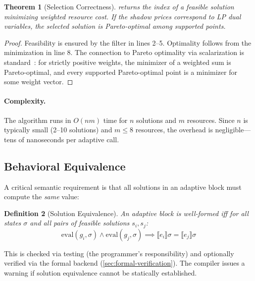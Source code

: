 \documentclass[11pt,a4paper]{article}
\newtheorem{theorem}{Theorem}[section]
\newtheorem{definition}[theorem]{Definition}
\begin{document}
\begin{theorem}[Selection Correctness]
 returns the index of a feasible solution minimizing
weighted resource cost.  If the shadow prices correspond to LP dual variables,
the selected solution is Pareto-optimal among supported points.
\end{theorem}

\begin{proof}
Feasibility is ensured by the filter in lines 2--5.  Optimality follows from
the minimization in line 8.  The connection to Pareto optimality via
scalarization is standard~\cite{ehrgott2005}: for strictly positive weights,
the minimizer of a weighted sum is Pareto-optimal, and every supported
Pareto-optimal point is a minimizer for some weight vector.
\end{proof}

\paragraph{Complexity.}  The algorithm runs in $O(nm)$ time for $n$ solutions
and $m$ resources.  Since $n$ is typically small (2--10 solutions) and $m \leq 8$
resources, the overhead is negligible---tens of nanoseconds per adaptive call.

\subsection{Behavioral Equivalence}

A critical semantic requirement is that all solutions in an adaptive block must
compute the \emph{same} value:

\begin{definition}[Solution Equivalence]
\label{def:solution-equiv}
An adaptive block is \emph{well-formed} iff for all states $\sigma$ and all
pairs of feasible solutions $s_i, s_j$:
\[
  \mathrm{eval}(g_i, \sigma) \land \mathrm{eval}(g_j, \sigma)
  \implies
  \llbracket e_i \rrbracket \sigma = \llbracket e_j \rrbracket \sigma
\]
\end{definition}

This is checked via testing (the programmer's responsibility) and optionally
verified via the formal backend (\cref{sec:formal-verification}).  The
compiler issues a warning if solution equivalence cannot be statically
established.


\end{document}
